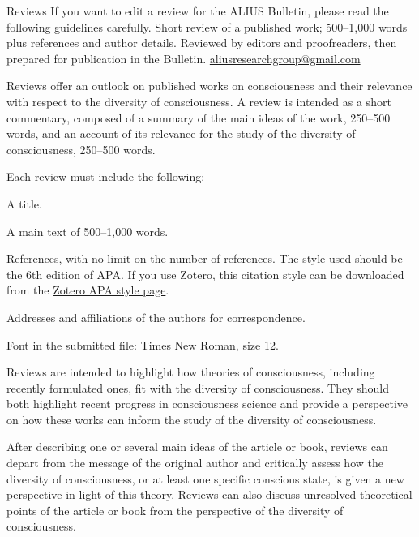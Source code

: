 \documentclass[11pt]{article}
\begin{document}
\guideHeader
  {Reviews}
  {If you want to edit a review for the ALIUS Bulletin, please read the following guidelines carefully.}
  {Short review of a published work; 500--1,000 words plus references and author details.}
  {Reviewed by editors and proofreaders, then prepared for publication in the Bulletin.}
  {\href{mailto:aliusresearchgroup@gmail.com}{aliusresearchgroup@gmail.com}}

Reviews offer an outlook on published works on consciousness and their relevance with respect to the diversity of consciousness. A review is intended as a short commentary, composed of a summary of the main ideas of the work, 250--500 words, and an account of its relevance for the study of the diversity of consciousness, 250--500 words.


Each review must include the following:

\begin{guideChecklist}
\item A title.
\item A main text of 500--1,000 words.
\item References, with no limit on the number of references. The style used should be the 6th edition of APA. If you use Zotero, this citation style can be downloaded from the \href{https://www.zotero.org/styles?q=id%3Aapa}{Zotero APA style page}.
\item Addresses and affiliations of the authors for correspondence.
\item Font in the submitted file: Times New Roman, size 12.
\end{guideChecklist}


Reviews are intended to highlight how theories of consciousness, including recently formulated ones, fit with the diversity of consciousness. They should both highlight recent progress in consciousness science and provide a perspective on how these works can inform the study of the diversity of consciousness.

After describing one or several main ideas of the article or book, reviews can depart from the message of the original author and critically assess how the diversity of consciousness, or at least one specific conscious state, is given a new perspective in light of this theory. Reviews can also discuss unresolved theoretical points of the article or book from the perspective of the diversity of consciousness.
\end{document}
